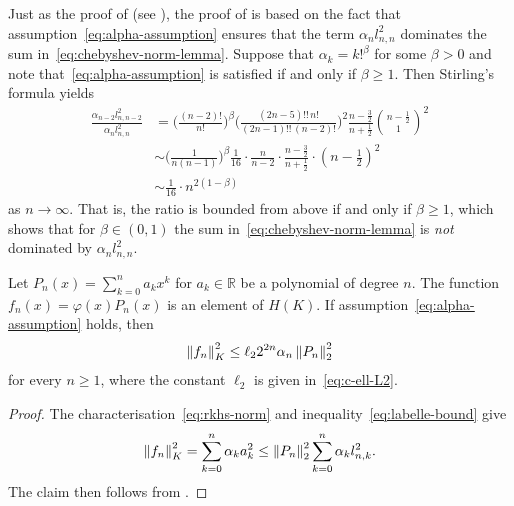 \documentclass{mcom-l}
\numberwithin{equation}{section}
\numberwithin{theorem}{section} %
\newcommand{\R}{\mathbb{R}} %
\begin{document}
\begin{remark} \label{rmk:alpha-assumption-l2}
  Just as the proof of  (see ), the proof of  is based on the fact that assumption~\eqref{eq:alpha-assumption} ensures that the term $\alpha_n l_{n,n}^2$ dominates the sum in~\eqref{eq:chebyshev-norm-lemma}.
  Suppose that $\alpha_k = k!^\beta$ for some $\beta > 0$ and note that~\eqref{eq:alpha-assumption} is satisfied if and only if $\beta \geq 1$.
  Then Stirling's formula yields
  \begin{equation*}
    \begin{split}
      \frac{\alpha_{n-2} l_{n, n-2}^2}{\alpha_n l_{n,n}^2} &= \bigg( \frac{(n-2)!}{n!} \bigg)^\beta \bigg( \frac{(2n-5)!! \, n!}{(2n-1)!! \, (n-2)!} \bigg)^2 \frac{n - \frac{3}{2}}{n + \frac{1}{2}} \binom{n - \frac{1}{2}}{1}^2 \\
      &\sim \bigg( \frac{1}{n(n-1)} \bigg)^\beta \frac{1}{16} \cdot \frac{n}{n-2} \cdot \frac{n - \frac{3}{2}}{n + \frac{1}{2}} \cdot (n - \tfrac{1}{2})^2 \\
      &\sim \frac{1}{16} \cdot n^{2(1 - \beta)}
      \end{split}
  \end{equation*}
  as $n \to \infty$.
  That is, the ratio is bounded from above if and only if $\beta \geq 1$, which shows that for $\beta \in (0, 1)$ the sum in~\eqref{eq:chebyshev-norm-lemma} is \emph{not} dominated by $\alpha_{n} l_{n, n}^2$.
\end{remark}

\begin{lemma} \label{lemma:l2-norm-bound}
  Let $P_n(x) = \sum_{k=0}^n a_k x^k$ for $a_k \in \R$ be a polynomial of degree $n$.
  The function $f_n(x) = \varphi(x) P_n(x)$ is an element of $H(K)$.
  If assumption~\eqref{eq:alpha-assumption} holds, then
  \begin{equation*}
    \norm[0]{f_n}_K^2 \leq \ell_2 2^{2n} \alpha_n \norm[0]{P_n}_{2}^2
  \end{equation*}
  for every $n \geq 1$, where the constant $\ell_2$ is given in~\eqref{eq:c-ell-L2}.
\end{lemma}
\begin{proof}
  The characterisation~\eqref{eq:rkhs-norm} and inequality~\eqref{eq:labelle-bound} give
  \begin{equation*}
    \norm[0]{f_n}_K^2 = \sum_{k=0}^n \alpha_k a_k^2 \leq \norm[0]{P_n}_{2}^2 \sum_{k=0}^n \alpha_k l_{n,k}^2.
  \end{equation*}
  The claim then follows from .
\end{proof}
\end{document}
